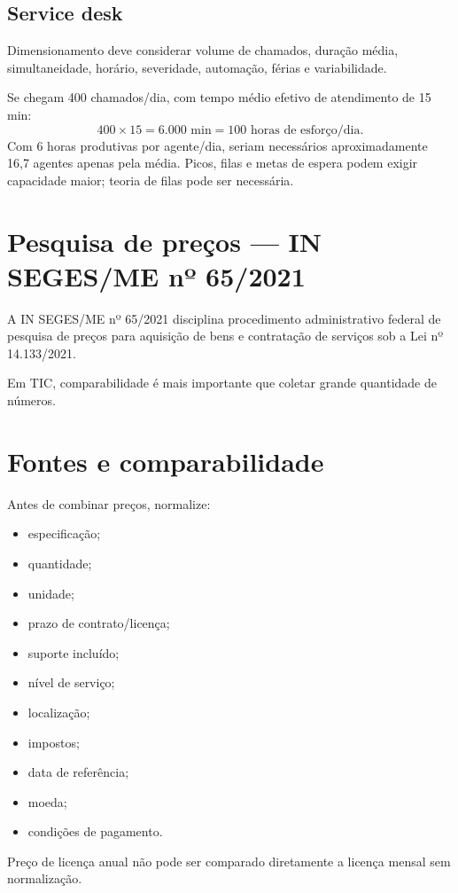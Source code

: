 \subsection{Service desk}

Dimensionamento deve considerar volume de chamados, duração média, simultaneidade, horário, severidade, automação, férias e variabilidade.

Se chegam 400 chamados/dia, com tempo médio efetivo de atendimento de 15 min:
\[
400\times15=6.000\text{ min}=100\text{ horas de esforço/dia}.
\]
Com 6 horas produtivas por agente/dia, seriam necessários aproximadamente 16,7 agentes apenas pela média. Picos, filas e metas de espera podem exigir capacidade maior; teoria de filas pode ser necessária.

\section{Pesquisa de preços — IN SEGES/ME nº 65/2021}

A IN SEGES/ME nº 65/2021 disciplina procedimento administrativo federal de pesquisa de preços para aquisição de bens e contratação de serviços sob a Lei nº 14.133/2021.

Em TIC, comparabilidade é mais importante que coletar grande quantidade de números.

\section{Fontes e comparabilidade}

Antes de combinar preços, normalize:
\begin{itemize}
\item especificação;
\item quantidade;
\item unidade;
\item prazo de contrato/licença;
\item suporte incluído;
\item nível de serviço;
\item localização;
\item impostos;
\item data de referência;
\item moeda;
\item condições de pagamento.
\end{itemize}

Preço de licença anual não pode ser comparado diretamente a licença mensal sem normalização.


